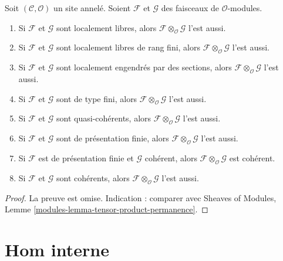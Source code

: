 \begin{lemma}
\label{lemma-tensor-product-permanence}
Soit $(\mathcal{C}, \mathcal{O})$ un site annelé.
Soient $\mathcal{F}$ et $\mathcal{G}$ des faisceaux de $\mathcal{O}$-modules.
\begin{enumerate}
\item Si $\mathcal{F}$ et $\mathcal{G}$ sont localement libres, alors
$\mathcal{F} \otimes_\mathcal{O} \mathcal{G}$ l'est aussi.
\item Si $\mathcal{F}$ et $\mathcal{G}$ sont localement libres de rang fini,
alors $\mathcal{F} \otimes_\mathcal{O} \mathcal{G}$ l'est aussi.
\item Si $\mathcal{F}$ et $\mathcal{G}$ sont localement engendrés par des
sections, alors $\mathcal{F} \otimes_\mathcal{O} \mathcal{G}$ l'est aussi.
\item Si $\mathcal{F}$ et $\mathcal{G}$ sont de type fini, alors
$\mathcal{F} \otimes_\mathcal{O} \mathcal{G}$ l'est aussi.
\item Si $\mathcal{F}$ et $\mathcal{G}$ sont quasi-cohérents, alors
$\mathcal{F} \otimes_\mathcal{O} \mathcal{G}$ l'est aussi.
\item Si $\mathcal{F}$ et $\mathcal{G}$ sont de présentation finie, alors
$\mathcal{F} \otimes_\mathcal{O} \mathcal{G}$ l'est aussi.
\item Si $\mathcal{F}$ est de présentation finie et $\mathcal{G}$ cohérent,
alors $\mathcal{F} \otimes_\mathcal{O} \mathcal{G}$ est cohérent.
\item Si $\mathcal{F}$ et $\mathcal{G}$ sont cohérents, alors
$\mathcal{F} \otimes_\mathcal{O} \mathcal{G}$ l'est aussi.
\end{enumerate}
\end{lemma}

\begin{proof}
La preuve est omise. Indication : comparer avec
Sheaves of Modules, Lemme \ref{modules-lemma-tensor-product-permanence}.
\end{proof}



\section{Hom interne}
\label{section-internal-hom}

